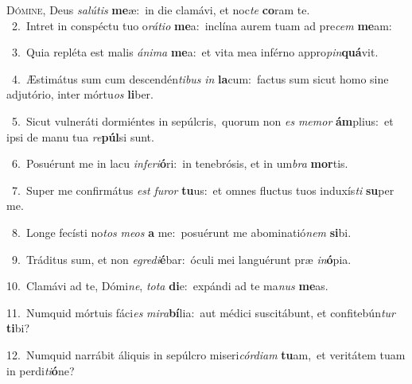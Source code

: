 \lettrine{\initial\textcolor{\initialcolor}{D}}{ómine,} Deus \textit{sa}\-\textit{lú}\textit{tis} \textbf{me}\-æ:~\star in die clamávi, et noc\textit{te} \textbf{co}\-ram te.\\
{\numbfont\textcolor{\numbcolor}{~2.}}~Intret in conspéctu tuo o\-\textit{rá}\-\textit{ti}\textit{o} \textbf{me}\-a:~\star inclína aurem tuam ad pre\textit{cem} \textbf{me}\-am:\par
{\numbfont\textcolor{\numbcolor}{~3.}}~Quia repléta est malis \textit{á}\-\textit{ni}\textit{ma} \textbf{me}\-a:~\star et vita mea inférno appro\-\textit{pin}\-\textbf{quá}vit.\par
{\numbfont\textcolor{\numbcolor}{~4.}}~Æstimátus sum cum descendén\-\textit{ti}\-\textit{bus} \textit{in} \textbf{la}\-cum:~\star factus sum sicut homo sine adjutório, inter mórtu\textit{os} \textbf{li}\-ber.\par
{\numbfont\textcolor{\numbcolor}{~5.}}~Sicut vulneráti dormiéntes in sepúlcris,~\dagger quorum non \textit{es} \textit{me}\-\textit{mor} \textbf{ám}\-plius:~\star et ipsi de manu tua \textit{re}\-\textbf{púl}si sunt.\par
{\numbfont\textcolor{\numbcolor}{~6.}}~Posuérunt me in lacu \textit{in}\-\textit{fe}\textit{ri}\textbf{ó}ri:~\star in tenebrósis, et in um\textit{bra} \textbf{mor}\-tis.\par
{\numbfont\textcolor{\numbcolor}{~7.}}~Super me confirmátus \textit{est} \textit{fu}\-\textit{ror} \textbf{tu}\-us:~\star et omnes fluctus tuos induxís\textit{ti} \textbf{su}\-per me.\par
{\numbfont\textcolor{\numbcolor}{~8.}}~Longe fecísti no\textit{tos} \textit{me}\-\textit{os} \textbf{a} me:~\star posuérunt me abominatió\textit{nem} \textbf{si}\-bi.\par
{\numbfont\textcolor{\numbcolor}{~9.}}~Tráditus sum, et non \textit{e}\-\textit{gre}\textit{di}\textbf{é}bar:~\star óculi mei languérunt præ \textit{in}\-\textbf{ó}pia.\par
{\numbfont\textcolor{\numbcolor}{10.}}~Clamávi ad te, Dómi\-\textit{ne}\-, \textit{to}\-\textit{ta} \textbf{di}\-e:~\star expándi ad te ma\textit{nus} \textbf{me}\-as.\par
{\numbfont\textcolor{\numbcolor}{11.}}~Numquid mórtuis fáci\textit{es} \textit{mi}\-\textit{ra}\textbf{bí}lia:~\star aut médici suscitábunt, et confitebún\textit{tur} \textbf{ti}\-bi?\par
{\numbfont\textcolor{\numbcolor}{12.}}~Numquid narrábit áliquis in sepúlcro miseri\-\textit{cór}\-\textit{di}\textit{am} \textbf{tu}\-am,~\star et veritátem tuam in perdi\-\textit{ti}\-\textbf{ó}ne?\par
